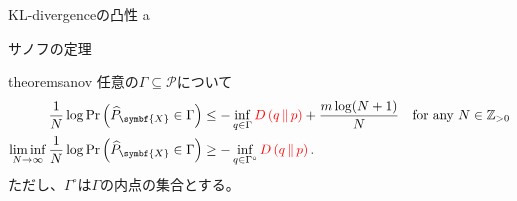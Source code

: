 \documentclass[lualatex,handout]{beamer}
\newcommand{\mycolor}[2]{%
  \begingroup
  \colorlet{currentcolor}{.}%
  \color{#1}#2%
  \color{currentcolor}%
  \endgroup
}
\newcommand{\emm}[1]{\mycolor{red}{#1}}
\newcommand\KL[2]{D\left(#1\,\|\,#2\right)}
\theoremstyle{definition}
\begin{document}
\begin{frame}{KL-divergenceの凸性}
a
\end{frame}
\fi

\begin{frame}{サノフの定理}
\begin{restatable}[サノフの定理]{theorem}{sanov}
\footnotesize
任意の$\Gamma\subseteq\mathcal{P}$について
\begin{align*}
\frac1N\log\Pr\left(\widehat{P}_{\symbf{X}} \in \Gamma\right) &\le -\inf_{q\in \Gamma} \emm{\KL{q}{p}} + \frac{m\log(N+1)}N\quad\text{for any $N\in\mathbb{Z}_{>0}$}\\
\liminf_{N\to\infty}\frac1N\log \Pr\left(\widehat{P}_{\symbf{X}} \in \Gamma\right) &\ge -\inf_{q\in \Gamma^\circ} \emm{\KL{q}{p}}.
\end{align*}
ただし、$\Gamma^\circ$は$\Gamma$の内点の集合とする。
\end{restatable}
\end{frame}
\end{document}

